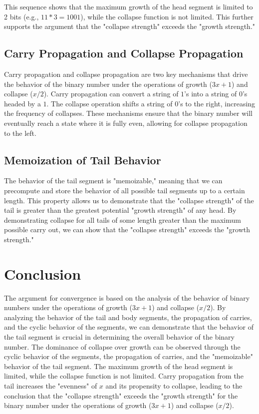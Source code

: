 \documentclass{article}
\begin{document}
This sequence shows that the maximum growth of the head segment is limited to 2 bits (e.g., $11 * 3 = 1001$), while the collapse function is not limited. This further supports the argument that the "collapse strength" exceeds the "growth strength."

\subsection{Carry Propagation and Collapse Propagation}
Carry propagation and collapse propagation are two key mechanisms that drive the behavior of the binary number under the operations of growth ($3x + 1$) and collapse ($x/2$). Carry propagation can convert a string of $1$'s into a string of $0$'s headed by a $1$. The collapse operation shifts a string of $0$'s to the right, increasing the frequency of collapses. These mechanisms ensure that the binary number will eventually reach a state where it is fully even, allowing for collapse propagation to the left.

\subsection{Memoization of Tail Behavior}
The behavior of the tail segment is "memoizable," meaning that we can precompute and store the behavior of all possible tail segments up to a certain length. This property allows us to demonstrate that the "collapse strength" of the tail is greater than the greatest potential "growth strength" of any head. By demonstrating collapse for all tails of some length greater than the maximum possible carry out, we can show that the "collapse strength" exceeds the "growth strength."

\section{Conclusion}
The argument for convergence is based on the analysis of the behavior of binary numbers under the operations of growth ($3x + 1$) and collapse ($x/2$). By analyzing the behavior of the tail and body segments, the propagation of carries, and the cyclic behavior of the segments, we can demonstrate that the behavior of the tail segment is crucial in determining the overall behavior of the binary number. The dominance of collapse over growth can be observed through the cyclic behavior of the segments, the propagation of carries, and the "memoizable" behavior of the tail segment. The maximum growth of the head segment is limited, while the collapse function is not limited. Carry propagation from the tail increases the "evenness" of $x$ and its propensity to collapse, leading to the conclusion that the "collapse strength" exceeds the "growth strength" for the binary number under the operations of growth ($3x + 1$) and collapse ($x/2$).
\end{document}
